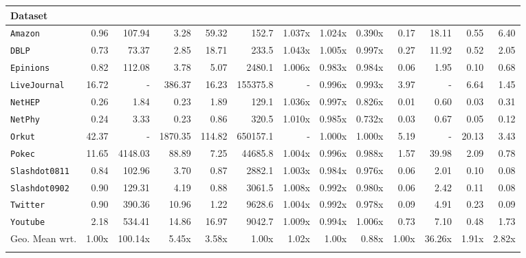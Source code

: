 \documentclass[10pt,journal,compsoc]{IEEEtran}
\newcommand\acro{{\sc{HyperFuseR\xspace}\xspace}\xspace}
\begin{document}
\begin{table}
{\begin{tabular}{l|rrrr|rrrr|rrrr}
Dataset      &            &         &         &        &            &         &         &         &            &       &       &      \\
\midrule
{\tt Amazon }       &       0.96 &  107.94 &    3.28 &  59.32 &      152.7 &  1.037x &  1.024x &  0.390x &       0.17 & 18.11 &  0.55 & 6.40 \\
{\tt DBLP }         &       0.73 &   73.37 &    2.85 &  18.71 &      233.5 &  1.043x &  1.005x &  0.997x &       0.27 & 11.92 &  0.52 & 2.05 \\
{\tt Epinions }     &       0.82 &  112.08 &    3.78 &   5.07 &     2480.1 &  1.006x &  0.983x &  0.984x &       0.06 &  1.95 &  0.10 & 0.68 \\
{\tt LiveJournal }  &      16.72 &       - &  386.37 &  16.23 &   155375.8 &       - &  0.996x &  0.993x &       3.97 &     - &  6.64 & 1.45 \\
{\tt NetHEP }       &       0.26 &    1.84 &    0.23 &   1.89 &      129.1 &  1.036x &  0.997x &  0.826x &       0.01 &  0.60 &  0.03 & 0.31 \\
{\tt NetPhy }       &       0.24 &    3.33 &    0.23 &   0.86 &      320.5 &  1.010x &  0.985x &  0.732x &       0.03 &  0.67 &  0.05 & 0.12 \\
{\tt Orkut }        &      42.37 &       - & 1870.35 & 114.82 &   650157.1 &       - &  1.000x &  1.000x &       5.19 &     - & 20.13 & 3.43 \\
{\tt Pokec }        &      11.65 & 4148.03 &   88.89 &   7.25 &    44685.8 &  1.004x &  0.996x &  0.988x &       1.57 & 39.98 &  2.09 & 0.78 \\
{\tt Slashdot0811 } &       0.84 &  102.96 &    3.70 &   0.87 &     2882.1 &  1.003x &  0.984x &  0.976x &       0.06 &  2.01 &  0.10 & 0.08 \\
{\tt Slashdot0902 } &       0.90 &  129.31 &    4.19 &   0.88 &     3061.5 &  1.008x &  0.992x &  0.980x &       0.06 &  2.42 &  0.11 & 0.08 \\
{\tt Twitter }      &       0.90 &  390.36 &   10.96 &   1.22 &     9628.6 &  1.004x &  0.992x &  0.978x &       0.09 &  4.91 &  0.23 & 0.09 \\
{\tt Youtube }      &       2.18 &  534.41 &   14.86 &  16.97 &     9042.7 &  1.009x &  0.994x &  1.006x &       0.73 &  7.10 &  0.48 & 1.73 \\
\bottomrule
Geo. Mean wrt.&1.00x&100.14x&5.45x&3.58x&1.00x&1.02x&1.00x&0.88x&1.00x&36.26x&1.91x&2.82x \\ \acro
\end{tabular}



    }
    \end{table}
\end{document}
